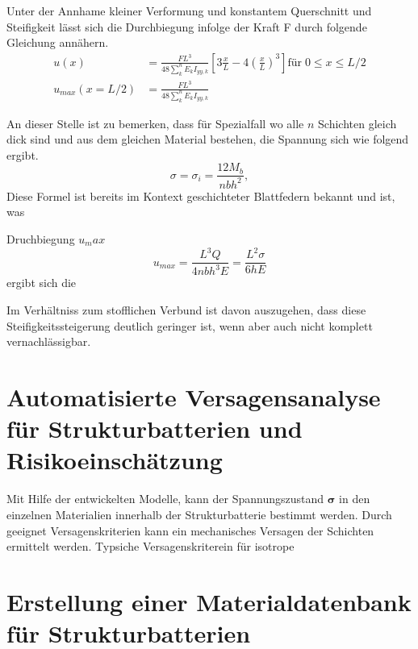 Unter der Annhame kleiner Verformung und konstantem Querschnitt und Steifigkeit lässt sich die Durchbiegung infolge der Kraft F durch folgende Gleichung annähern.
\begin{align}
    u(x) &= \frac{F L^3}{48 \sum_{k}^{n} E_k I_{yy,k}} \left[ 3 \frac{x}{L} - 4\left(\frac{x}{L}\right)^3 \right] \text{für} \; 0 \leq x \leq L/2 \\
    u_{max} (x = L/2) &= \frac{FL^3}{48 \sum_{k}^{n} E_k I_{yy,k}} 
\end{align}



An dieser Stelle ist zu bemerken, dass für Spezialfall wo alle $n$ Schichten gleich dick sind und aus dem gleichen Material bestehen, die Spannung sich wie folgend ergibt.
\begin{equation}
    \sigma = \sigma_i = \frac{12 M_{b}}{n b h^2},
\end{equation}
Diese Formel ist bereits im Kontext geschichteter Blattfedern bekannt und ist, was 

Druchbiegung $u_max$
\begin{equation}
    u_{max} = \frac{L^3 Q}{4 n b h^3 E} = \frac{L^2 \sigma}{6 h E}
\end{equation}
ergibt sich die 


Im Verhältniss zum stofflichen Verbund ist davon auszugehen, dass diese Steifigkeitssteigerung deutlich geringer ist, wenn aber auch nicht komplett vernachlässigbar.


\section{\label{sec:automated_failure}Automatisierte Versagensanalyse für Strukturbatterien und Risikoeinschätzung}

Mit Hilfe der entwickelten Modelle, kann der Spannungszustand $\boldsymbol{\sigma}$ in den einzelnen Materialien innerhalb der Strukturbatterie bestimmt werden. Durch geeignet Versagenskriterien kann ein mechanisches Versagen der Schichten ermittelt werden.  
Typsiche Versagenskriterein für isotrope 




\section{\label{sec:digitalisation}Erstellung einer Materialdatenbank für Strukturbatterien}